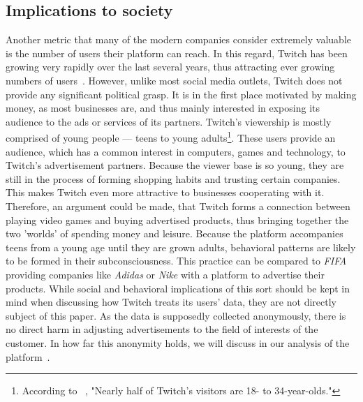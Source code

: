 \subsection{Implications to society}
Another metric that many of the modern companies consider extremely valuable is the number of users their platform               
can reach. In this regard, Twitch has been growing very rapidly over the last several years, thus attracting ever growing numbers of users~\cite{twitch-survey}. 
However, unlike most social media outlets, Twitch does not provide any significant political grasp. It is in the first place motivated by making money, as most businesses are, and thus mainly interested in exposing its audience to the ads or services of its partners. Twitch's viewership is mostly comprised of young people --- teens to young adults\footnote{According to ~\cite{twitch-survey}, "Nearly half of Twitch's visitors are 18- to 34-year-olds."}. These users provide an audience, which has a common interest in computers, games and technology, to Twitch's advertisement partners. Because the viewer base is so young, they are still in the process of forming shopping habits and trusting certain companies. This makes Twitch even more attractive to businesses cooperating with it. Therefore, an argument could be made, that Twitch forms a connection between playing video games and buying advertised products, thus bringing together the two 'worlds' of spending money and leisure. Because the platform accompanies teens from a young age until they are grown adults, behavioral patterns are likely to be formed in their subconsciousness. This practice can be compared to \textit{FIFA} providing companies like \textit{Adidas} or \textit{Nike} with a platform  to advertise their products. While social and behavioral implications of this sort should be kept in mind when discussing how Twitch treats its users' data, they are not directly subject of this paper. As the data is supposedly collected anonymously, there is no direct harm in adjusting advertisements to the field of interests of the customer. In how far this anonymity holds, we will discuss in our analysis of the platform~. 
